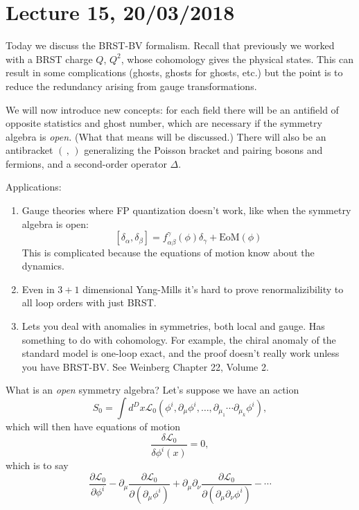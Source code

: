\section*{Lecture 15, 20/03/2018}
Today we discuss the BRST-BV formalism.
Recall that previously we worked with a BRST charge $Q$, $Q^2$, whose cohomology gives the physical states.
This can result in some complications (ghosts, ghosts for ghosts, etc.) but the point is to reduce the redundancy arising from gauge transformations.

We will now introduce new concepts: for each field there will be an antifield of opposite statistics and ghost number, which are necessary if the symmetry algebra is \emph{open.} (What that means will be discussed.)
There will also be an antibracket $(\,,\,)$ generalizing the Poisson bracket and pairing bosons and fermions, and a second-order operator $\Delta$.

Applications:
\begin{enumerate}
    \item Gauge theories where FP quantization doesn't work, like when the symmetry algebra is open:
    \[
    [\delta_\alpha, \delta_\beta] = f_{\alpha \beta}^\gamma(\phi) \delta_\gamma + \text{EoM}(\phi)
    \]
    This is complicated because the equations of motion know about the dynamics.
    \item Even in $3+1$ dimensional Yang-Mills it's hard to prove renormalizibility to all loop orders with just BRST.
    \item Lets you deal with anomalies in symmetries, both local and gauge.
    Has something to do with cohomology.
    For example, the chiral anomaly of the standard model is one-loop exact, and the proof doesn't really work unless you have BRST-BV. See Weinberg Chapter 22, Volume 2.
\end{enumerate}

What is an \emph{open} symmetry algebra?
Let's suppose we have an action
\[
S_0 = \int d^D x \mathcal{L}_0 (\phi^i, \partial_\mu \phi^i, \dots, \partial_{\mu_1} \cdots \partial_{\mu_k} \phi^i),
\]
which will then have equations of motion
\[
\frac{\delta \mathcal{L}_0}{\delta \phi^i(x)} = 0,
\]
which is to say
\[
\frac{\partial \mathcal{L}_0}{\partial \phi^i} - \partial_\mu \frac{\partial \mathcal{L}_0}{\partial (\partial_\mu\phi^i)} +  \partial_\mu  \partial_\nu \frac{\partial \mathcal{L}_0}{\partial (\partial_\mu \partial_\nu \phi^i)} - \cdots
\]